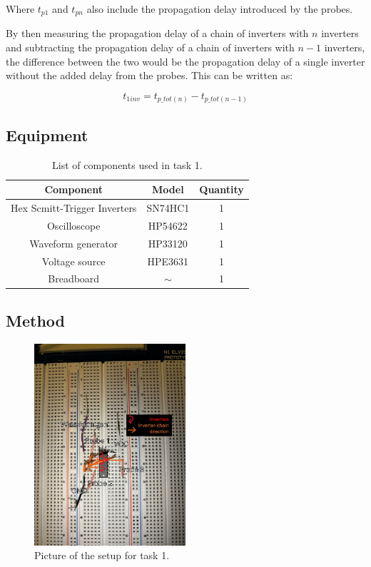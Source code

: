 \documentclass[onecolumn]{article}
\begin{document}
Where $t_{p1}$ and $t_{pn}$ also include the propagation delay introduced by the probes.

By then measuring the propagation delay of a chain of inverters with $n$ inverters and subtracting the propagation delay of a chain of inverters with $n-1$ inverters, the difference between the two would be the propagation delay of a single inverter without the added delay from the probes. This can be written as:

\begin{equation}
    t_{1inv} = t_{p\_tot(n)} - t_{p\_tot(n-1)} \label{eq:1inv}
\end{equation}

\subsection{Equipment}
\begin{table}[h!]
    \centering
    \begin{tabular}{|c|c|c|}
        \hline
        \textbf{Component} & \textbf{Model} & \textbf{Quantity} \\
        \hline
        Hex Scmitt-Trigger Inverters & SN74HC1 & 1 \\
        Oscilloscope & HP54622 & 1 \\
        Waveform generator  & HP33120 & 1\\
        Voltage source & HPE3631 & 1 \\
        Breadboard & $\sim$ & 1 \\
        \hline
    \end{tabular}
    \caption{List of components used in task 1.}
    \label{tab:bom}
\end{table}

\subsection{Method}

\begin{figure}[h!]
    \centering
    \includegraphics[width=0.5\textwidth]{Circuit_draw.jpg}
    \caption{Picture of the setup for task 1.}  
    \label{fig:circuit}
\end{figure}
\end{document}
